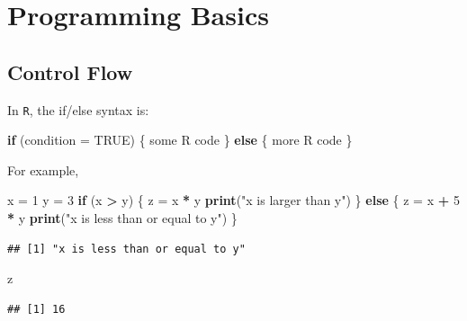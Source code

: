 \documentclass[]{book}
\newenvironment{Shaded}{\begin{snugshade}}{\end{snugshade}}
\newcommand{\KeywordTok}[1]{\textcolor[rgb]{0.13,0.29,0.53}{\textbf{#1}}}
\newcommand{\DataTypeTok}[1]{\textcolor[rgb]{0.13,0.29,0.53}{#1}}
\newcommand{\DecValTok}[1]{\textcolor[rgb]{0.00,0.00,0.81}{#1}}
\newcommand{\StringTok}[1]{\textcolor[rgb]{0.31,0.60,0.02}{#1}}
\newcommand{\OtherTok}[1]{\textcolor[rgb]{0.56,0.35,0.01}{#1}}
\newcommand{\ControlFlowTok}[1]{\textcolor[rgb]{0.13,0.29,0.53}{\textbf{#1}}}
\newcommand{\OperatorTok}[1]{\textcolor[rgb]{0.81,0.36,0.00}{\textbf{#1}}}
\newcommand{\NormalTok}[1]{#1}
\theoremstyle{definition}
\theoremstyle{definition}
\theoremstyle{definition}
\theoremstyle{remark}
\begin{document}
\section{Programming Basics}\label{programming-basics}

\subsection{Control Flow}\label{control-flow}

In \texttt{R}, the if/else syntax is:

\begin{Shaded}
\begin{Highlighting}[]
\ControlFlowTok{if}\NormalTok{ (}\DataTypeTok{condition =} \OtherTok{TRUE}\NormalTok{) \{}
\NormalTok{  some R code}
\NormalTok{\} }\ControlFlowTok{else}\NormalTok{ \{}
\NormalTok{  more R code}
\NormalTok{\}}
\end{Highlighting}
\end{Shaded}

For example,

\begin{Shaded}
\begin{Highlighting}[]
\NormalTok{x =}\StringTok{ }\DecValTok{1}
\NormalTok{y =}\StringTok{ }\DecValTok{3}
\ControlFlowTok{if}\NormalTok{ (x }\OperatorTok{>}\StringTok{ }\NormalTok{y) \{}
\NormalTok{  z =}\StringTok{ }\NormalTok{x }\OperatorTok{*}\StringTok{ }\NormalTok{y}
  \KeywordTok{print}\NormalTok{(}\StringTok{"x is larger than y"}\NormalTok{)}
\NormalTok{\} }\ControlFlowTok{else}\NormalTok{ \{}
\NormalTok{  z =}\StringTok{ }\NormalTok{x }\OperatorTok{+}\StringTok{ }\DecValTok{5} \OperatorTok{*}\StringTok{ }\NormalTok{y}
  \KeywordTok{print}\NormalTok{(}\StringTok{"x is less than or equal to y"}\NormalTok{)}
\NormalTok{\}}
\end{Highlighting}
\end{Shaded}

\begin{verbatim}
## [1] "x is less than or equal to y"
\end{verbatim}

\begin{Shaded}
\begin{Highlighting}[]
\NormalTok{z}
\end{Highlighting}
\end{Shaded}

\begin{verbatim}
## [1] 16
\end{verbatim}
\end{document}
